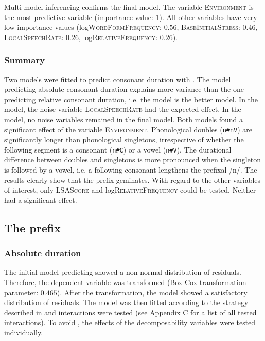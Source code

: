Multi-model inferencing confirms the final model. The variable \textsc{Environment} is the most predictive variable (importance value: $1$). All other variables have very low importance values  (log\textsc{WordFormFrequency}: $0.56$, \textsc{BaseInitialStress}: $0.46$, \textsc{LocalSpeechRate}: $0.26$, log\textsc{RelativeFrequency}: $0.26$).


\subsubsection{Summary}

Two models were fitted to predict consonant duration with  . The model predicting absolute consonant duration explains more variance than the one predicting relative consonant duration, i.e. the  model is the better model. In the  model, the noise variable \textsc{LocalSpeechRate} had the expected effect. In the  model, no noise variables remained in the final model.
 Both models found a significant effect of the variable \textsc{Environment}. Phonological doubles (\texttt{n\#nV}) are significantly longer than phonological singletons, irrespective of whether the following segment is a consonant (\texttt{n\#C}) or a vowel (\texttt{n\#V}). The durational difference between doubles and singletons is more pronounced when the singleton is followed by a vowel, i.e. a following consonant lengthens the prefixal /n/. The results clearly show that the prefix  geminates.
With regard to the other variables of interest, only \textsc{LSAScore} and log\textsc{RelativeFrequency} could be tested. Neither had a significant effect. 


\subsection{The prefix } \label{in corpus}


\subsubsection{Absolute duration}

The initial model predicting  showed a non-normal distribution of residuals. Therefore, the dependent variable was  transformed (Box-Cox-transformation  parameter: $0.465$). After the transformation, the model showed a satisfactory distribution of residuals. The model was then fitted according to the strategy described in  and interactions were tested (see \hyperref[Appendix C: Summaries of tested interactions in corpus study]{Appendix C} for a list of all tested interactions). 
To avoid , the effects of the decomposability variables were tested individually.



